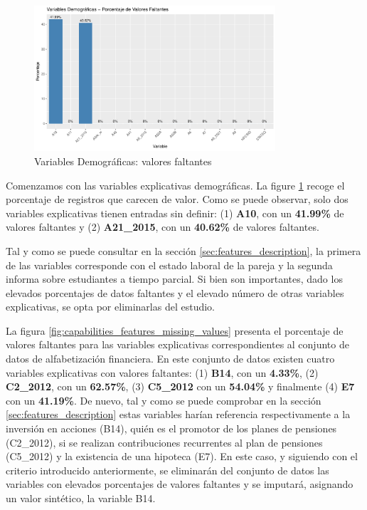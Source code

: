\documentclass[a4paper, 11pt]{article}
\begin{document}
\begin{figure}[ht]
    \centering
    \includegraphics[width=0.8\textwidth]{images/Demographic_Features__Missing_Values.pdf} 
    \caption{Variables Demográficas: valores faltantes}
    \label{fig:demographic_features_missing_values}
\end{figure}

Comenzamos con las variables explicativas demográficas. La figure \ref{fig:demographic_features_missing_values}
recoge el porcentaje de registros que carecen de valor. Como se puede observar, solo dos 
variables explicativas tienen entradas sin definir: (1) \textbf{A10}, con un \textbf{41.99\%}
de valores faltantes y (2) \textbf{A21\_2015}, con un \textbf{40.62\%} de valores faltantes. 

Tal y como se puede consultar en la sección \ref{sec:features_description}, la 
primera de las variables corresponde con el estado laboral de la pareja y la segunda informa 
sobre estudiantes a tiempo parcial. Si bien son importantes, dado los elevados porcentajes de
datos faltantes y el elevado número de otras variables explicativas, se opta por eliminarlas
del estudio.

La figura \ref{fig:capabilities_features_missing_values} presenta el porcentaje de valores 
faltantes para las variables explicativas correspondientes al conjunto de datos de alfabetización
financiera. En este conjunto de datos existen cuatro variables explicativas con valores faltantes:
(1) \textbf{B14}, con un \textbf{4.33\%}, (2) \textbf{C2\_2012}, con un \textbf{62.57\%}, (3) 
\textbf{C5\_2012} con un \textbf{54.04\%} y finalmente (4) \textbf{E7} con un \textbf{41.19\%}. De
nuevo, tal y como se puede comprobar en la sección \ref{sec:features_description} estas variables harían
referencia respectivamente a la inversión en acciones (B14), quién es el promotor de los planes de
pensiones (C2\_2012), si se realizan contribuciones recurrentes al plan de pensiones (C5\_2012) y
la existencia de una hipoteca (E7). En este caso, y siguiendo con el criterio introducido 
anteriormente, se eliminarán del conjunto de datos las variables con elevados porcentajes de
valores faltantes y se imputará, asignando un valor sintético, la variable B14.
\end{document}
